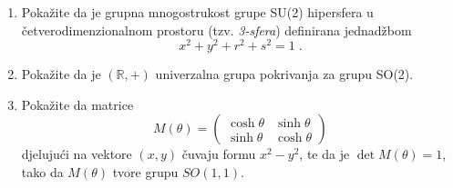 \begin{enumerate}[{5}.1]
\item Pokažite da je grupna mnogostrukost grupe SU(2) hipersfera u
 četverodimenzionalnom prostoru (tzv. \emph{3-sfera}) definirana
 jednadžbom 
\begin{displaymath}
x^2+y^2+r^2+s^2=1 \;.
\end{displaymath}

\item Pokažite da je $(\mathbb{R}, +)$ 
 univerzalna grupa pokrivanja za grupu SO(2).

\item Pokažite da matrice
\begin{equation}
 M(\theta) = \begin{pmatrix}
\cosh\theta & \sinh\theta  \\
\sinh\theta & \cosh\theta
\end{pmatrix}
\end{equation}
djelujući na vektore $(x, y)$ čuvaju formu $x^2 - y^2$, te da 
je $\det M(\theta) = 1$, tako da $M(\theta)$ tvore grupu
$SO(1,1)$.
\end{enumerate}
